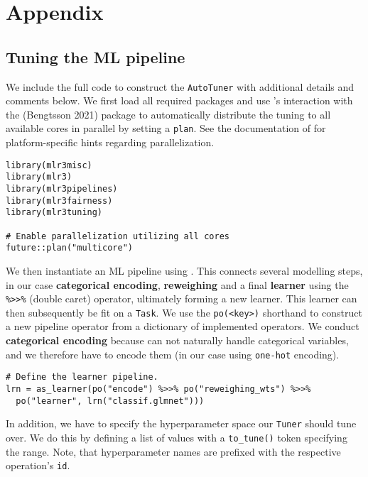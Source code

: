 \hypertarget{appendix}{%
\section{Appendix}\label{appendix}}

\hypertarget{tuning-the-ml-pipeline}{%
\subsection{Tuning the ML pipeline}\label{tuning-the-ml-pipeline}}

We include the full code to construct the \texttt{AutoTuner} with additional details
and comments below.
We first load all required packages and use 's interaction with the  (Bengtsson 2021) package
to automatically distribute the tuning to all available cores in parallel by setting a \texttt{plan}.
See the documentation of  for platform-specific hints regarding parallelization.

\begin{verbatim}
library(mlr3misc)
library(mlr3)
library(mlr3pipelines)
library(mlr3fairness)
library(mlr3tuning)

# Enable parallelization utilizing all cores
future::plan("multicore")
\end{verbatim}

We then instantiate an ML pipeline using .
This connects several modelling steps, in our case \textbf{categorical encoding}, \textbf{reweighing} and a final \textbf{learner} using the
\texttt{\%\textgreater{}\textgreater{}\%} (double caret) operator, ultimately forming a new learner.
This learner can then subsequently be fit on a \texttt{Task}. We use the \texttt{po(\textless{}key\textgreater{})} shorthand to construct a new
pipeline operator from a dictionary of implemented operators.
We conduct \textbf{categorical encoding} because  can not naturally handle categorical variables, and we therefore have
to encode them (in our case using \texttt{one-hot} encoding).

\begin{verbatim}
# Define the learner pipeline.
lrn = as_learner(po("encode") %>>% po("reweighing_wts") %>>%
  po("learner", lrn("classif.glmnet")))
\end{verbatim}

In addition, we have to specify the hyperparameter space our \texttt{Tuner} should tune over.
We do this by defining a list of values with a \texttt{to\_tune()} token specifying the range.
Note, that hyperparameter names are prefixed with the respective operation's \texttt{id}.

